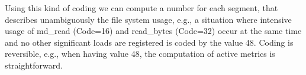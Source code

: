 \documentclass[]{llncs}
\begin{document}
Using this kind of coding we can compute a number for each segment, that describes unambiguously the file system usage, e.g., a situation where intensive usage of md\_read (Code=16) and read\_bytes (Code=32) occur at the same time and no other significant loads are registered is coded by the value 48.
Coding is reversible, e.g., when having value 48, the computation of active metrics is straightforward.



\end{document}
